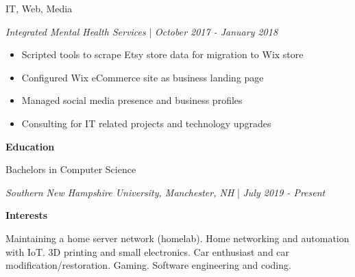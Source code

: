 \documentclass[letterpaper]{article}
\begin{document}
\begin{minipage}{0.7\textwidth}
\begin{tcolorbox}[colback=sidebar!0, frame empty, sharp corners=all, left=1em]
\begin{minipage}[t][0.973\textheight]{1.0\textwidth}
                \vspace{0.02\textheight}
                {\large IT, Web, Media}

                \textit{Integrated Mental Health Services} | \textit{October 2017 - January 2018}
                \begin{flushleft}
                    \begin{itemize}[leftmargin=1em, label=\textcolor{accent}{\textbullet}]
                        \item Scripted tools to scrape Etsy store data for migration to Wix store
                        \item Configured Wix eCommerce site as business landing page
                        \item Managed social media presence and business profiles
                        \item Consulting for IT related projects and technology upgrades
                    \end{itemize}
                \end{flushleft}

                \vspace{0.05\textheight}
                \textcolor{accent}{\textbf{{\Large Education}}}

                \vspace{0.02\textheight}
                {\large Bachelors in Computer Science}

                \textit{Southern New Hampshire University, Manchester, NH} | \textit{July 2019 - Present}

                \vspace{0.05\textheight}
                \textcolor{accent}{\textbf{{\Large Interests}}}
                \begin{flushleft}
                    Maintaining a home server network (homelab). Home networking and automation with IoT. 3D printing and small electronics.
                    Car enthusiast and car modification/restoration. Gaming. Software engineering and coding.
                \end{flushleft}
            \end{minipage}
        \end{tcolorbox}
    \end{minipage}
\end{document}
